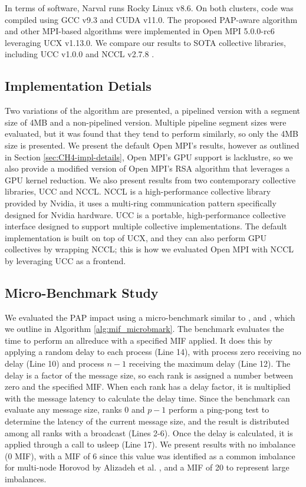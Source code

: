 In terms of software, Narval runs Rocky Linux v8.6.
On both clusters, code was compiled using GCC v9.3 and \gls{CUDA} v11.0.
The proposed \gls{PAP}-aware algorithm and other MPI-based algorithms were implemented in Open MPI 5.0.0-rc6 leveraging \gls{UCX} v1.13.0. 
We compare our results to \gls{SOTA} collective libraries, including \gls{UCC} v1.0.0 \cite{UCC} and \gls{NCCL} v2.7.8 \cite{NCCL}.

\subsection{Implementation Detials}
Two variations of the algorithm are presented, a pipelined version with a segment size of 4MB and a non-pipelined version.
Multiple pipeline segment sizes were evaluated, but it was found that they tend to perform similarly, so only the 4MB size is presented.
We present the default Open MPI's results, however as outlined in Section \ref{sec:CH4-impl-details}, Open MPI's \gls{GPU} support is lacklustre, so we also provide a modified version of Open MPI's \gls{RSA} algorithm that leverages a \gls{GPU} kernel reduction. 
We also present results from two contemporary collective libraries, \gls{UCC}  and \gls{NCCL}.
\gls{NCCL} is a high-performance collective library provided by Nvidia, it uses a multi-ring communication pattern specifically designed for Nvidia hardware.
\gls{UCC} is a portable, high-performance collective interface designed to support multiple collective implementations.
The default implementation is built on top of \gls{UCX}, and they can also perform \gls{GPU} collectives by wrapping \gls{NCCL}; this is how we evaluated Open MPI with \gls{NCCL} by leveraging \gls{UCC} as a frontend.

\subsection{Micro-Benchmark Study}
We evaluated the \gls{PAP} impact using a micro-benchmark similar to \cite{Faraj2008StudyProcArrivalMPIColl}, and \cite{Li2020DLPartialColl}, which we outline in Algorithm \ref{alg:mif_microbmark}.
The benchmark evaluates the time to perform an allreduce with a specified \gls{MIF} applied.
It does this by applying a random delay to each process (Line 14), with process zero receiving no delay (Line 10) and process $n-1$ receiving the maximum delay (Line 12).
The delay is a factor of the message size, so each rank is assigned a number between zero and the specified MIF.
When each rank has a delay factor, it is multiplied with the message latency to calculate the delay time.
Since the benchmark can evaluate any message size, ranks 0 and $p-1$ perform a ping-pong test to determine the latency of the current message size, and the result is distributed among all ranks with a broadcast (Lines 2-6).
Once the delay is calculated, it is applied through a call to usleep (Line 17).
We present results with no imbalance (0 \gls{MIF}), with a \gls{MIF} of 6 since this value was identified as a common imbalance for multi-node Horovod by Alizadeh et al. \cite{Alizadeh2022PAPCollDL}, and a \gls{MIF} of 20 to represent large imbalances.

